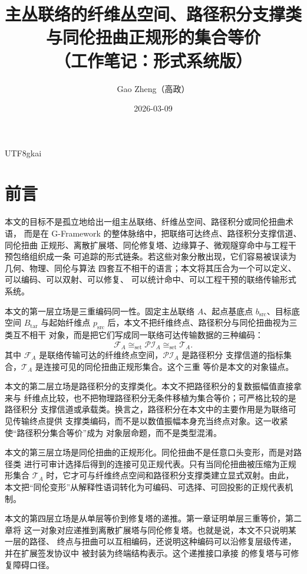 \documentclass[12pt]{article}
\newcommand{\GFramework}{\textsf{G-Framework}}
\begin{document}
\begin{CJK*}{UTF8}{gkai}

\title{主丛联络的纤维丛空间、路径积分支撑类与同伦扭曲正规形的集合等价\\（工作笔记：形式系统版）}
\author{Gao Zheng（高政）}
\date{2026-03-09}
\maketitle

\section*{前言}

本文的目标不是孤立地给出一组主丛联络、纤维丛空间、路径积分或同伦扭曲术语，
而是在 \GFramework{} 的整体脉络中，把联络可达终点、路径积分支撑信道、同伦扭曲
正规形、离散扩展塔、同伦修复塔、边缘算子、微观隧穿命中与工程干预包络组织成一条
可追踪的形式链条。若这些对象分散出现，它们容易被误读为几何、物理、同伦与算法
四套互不相干的语言；本文将其压合为一个可以定义、可以编码、可以双射、可以修复、
可以统计命中、可以工程干预的联络传输形式系统。

本文的第一层立场是三重编码同一性。固定主丛联络 \(A\)、起点基底点
\(b_{\mathrm{src}}\)、目标底空间 \(B_{\mathrm{tar}}\) 与起始纤维点
\(p_{\mathrm{src}}\) 后，本文不把纤维终点、路径积分与同伦扭曲视为三类互不相干
对象，而是把它们写成同一联络可达传输数据的三种编码：
\[
  \mathcal F_A
  \cong_{\mathrm{set}}
  \mathcal{PI}_A
  \cong_{\mathrm{set}}
  \mathcal T_A.
\]
其中 \(\mathcal F_A\) 是联络传输可达的纤维终点空间，\(\mathcal{PI}_A\) 是路径积分
支撑信道的指标集合，\(\mathcal T_A\) 是连接可见的同伦扭曲正规形集合。这个三重
等价是本文的对象锚点。

本文的第二层立场是路径积分的支撑类化。本文不把路径积分的复数振幅值直接拿来与
纤维点比较，也不把物理路径积分无条件移植为集合等价；可严格比较的是路径积分
支撑信道或承载类。换言之，路径积分在本文中的主要作用是为联络可见传输终点提供
支撑类编码，而不是以数值振幅本身充当终点对象。这一收紧使“路径积分集合等价”成为
对象层命题，而不是类型混淆。

本文的第三层立场是同伦扭曲的正规形化。同伦扭曲不是任意口头变形，而是对路径类
进行可审计选择后得到的连接可见正规代表。只有当同伦扭曲被压缩为正规形集合
\(\mathcal T_A\) 时，它才可与纤维终点空间和路径积分支撑类建立显式双射。由此，
本文把“同伦变形”从解释性语词转化为可编码、可选择、可回投影的正规代表机制。

本文的第四层立场是从单层等价到修复塔的递推。第一章证明单层三重等价，第二章将
这一对象对应递推到离散扩展塔与同伦修复塔。也就是说，本文不只说明某一层的路径、
终点与扭曲可以互相编码，还说明这种编码可以沿修复层级传递，并在扩展签发协议中
被封装为终端结构表示。这个递推接口承接 \cite{RepoTex35Tower,RepoTex29RepairableObstruction}
的修复塔与可修复障碍口径。


\end{CJK*}
\end{document}

